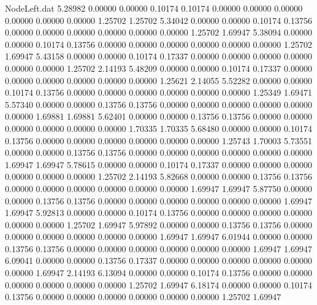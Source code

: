 \begin{filecontents}{NodeLeft.dat}
   5.28982    0.00000    0.00000     0.10174    0.10174    0.00000    0.00000    0.00000    0.00000    0.00000    0.00000    1.25702    1.25702
   5.34042    0.00000    0.00000     0.10174    0.13756    0.00000    0.00000    0.00000    0.00000    0.00000    0.00000    1.25702    1.69947
   5.38094    0.00000    0.00000     0.10174    0.13756    0.00000    0.00000    0.00000    0.00000    0.00000    0.00000    1.25702    1.69947
   5.43158    0.00000    0.00000     0.10174    0.17337    0.00000    0.00000    0.00000    0.00000    0.00000    0.00000    1.25702    2.14193
   5.48209    0.00000    0.00000     0.10174    0.17337    0.00000    0.00000    0.00000    0.00000    0.00000    0.00000    1.25621    2.14055
   5.52282    0.00000    0.00000     0.10174    0.13756    0.00000    0.00000    0.00000    0.00000    0.00000    0.00000    1.25349    1.69471
   5.57340    0.00000    0.00000     0.13756    0.13756    0.00000    0.00000    0.00000    0.00000    0.00000    0.00000    1.69881    1.69881
   5.62401    0.00000    0.00000     0.13756    0.13756    0.00000    0.00000    0.00000    0.00000    0.00000    0.00000    1.70335    1.70335
   5.68480    0.00000    0.00000     0.10174    0.13756    0.00000    0.00000    0.00000    0.00000    0.00000    0.00000    1.25743    1.70003
   5.73551    0.00000    0.00000     0.13756    0.13756    0.00000    0.00000    0.00000    0.00000    0.00000    0.00000    1.69947    1.69947
   5.78615    0.00000    0.00000     0.10174    0.17337    0.00000    0.00000    0.00000    0.00000    0.00000    0.00000    1.25702    2.14193
   5.82668    0.00000    0.00000     0.13756    0.13756    0.00000    0.00000    0.00000    0.00000    0.00000    0.00000    1.69947    1.69947
   5.87750    0.00000    0.00000     0.13756    0.13756    0.00000    0.00000    0.00000    0.00000    0.00000    0.00000    1.69947    1.69947
   5.92813    0.00000    0.00000     0.10174    0.13756    0.00000    0.00000    0.00000    0.00000    0.00000    0.00000    1.25702    1.69947
   5.97892    0.00000    0.00000     0.13756    0.13756    0.00000    0.00000    0.00000    0.00000    0.00000    0.00000    1.69947    1.69947
   6.01944    0.00000    0.00000     0.13756    0.13756    0.00000    0.00000    0.00000    0.00000    0.00000    0.00000    1.69947    1.69947
   6.09041    0.00000    0.00000     0.13756    0.17337    0.00000    0.00000    0.00000    0.00000    0.00000    0.00000    1.69947    2.14193
   6.13094    0.00000    0.00000     0.10174    0.13756    0.00000    0.00000    0.00000    0.00000    0.00000    0.00000    1.25702    1.69947
   6.18174    0.00000    0.00000     0.10174    0.13756    0.00000    0.00000    0.00000    0.00000    0.00000    0.00000    1.25702    1.69947

\end{filecontents}
